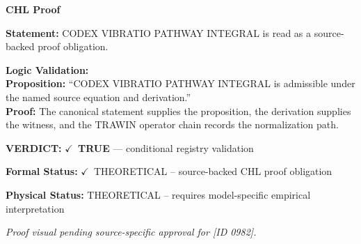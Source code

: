 \vspace{0.45em}
\noindent\textbf{CHL Proof}\par
\textbf{Statement:} CODEX VIBRATIO PATHWAY INTEGRAL is read as a source-backed proof obligation.

\textbf{Logic Validation:}\\
\textbf{Proposition:} ``CODEX VIBRATIO PATHWAY INTEGRAL is admissible under the named source equation and derivation.''\\
\textbf{Proof:} The canonical statement supplies the proposition, the derivation supplies the witness, and the TRAWIN operator chain records the normalization path.

\textbf{VERDICT:} \ensuremath{\checkmark}\ \textbf{TRUE} --- conditional registry validation

\textbf{Formal Status:} \ensuremath{\checkmark}\ THEORETICAL -- source-backed CHL proof obligation

\textbf{Physical Status:} THEORETICAL -- requires model-specific empirical interpretation
\par\vspace{0.45em}
\par
\vfill
\begingroup\footnotesize\itshape
Proof visual pending source-specific approval for [ID 0982].
\par\endgroup
\vfill
\endgroup
\endgroup
